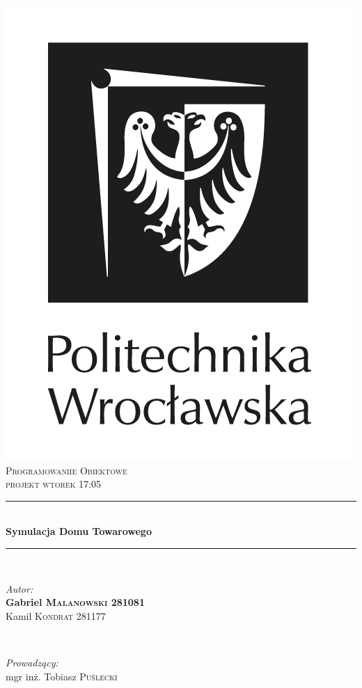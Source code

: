 \documentclass[11pt]{article}
\begin{document}
\begin{titlepage}
\newcommand{\HRule}{\rule{\linewidth}{0.5mm}} %
\center %
\includegraphics[scale = 0.21]{pwr-logo.png}\\[2cm]
\textsc{\Large Programowaniie Obiektowe}\\[0.5cm] 
\textsc{\large projekt wtorek 17:05}\\[0.5cm]
\HRule \\[0.4cm]
{ \huge \bfseries Symulacja Domu Towarowego
}\\[0.4cm] 
\HRule \\[0.8cm]
\begin{minipage}{0.5\textwidth}
\begin{flushleft} \large
\emph{Autor:}\\
\textbf{Gabriel \textsc{Malanowski} 281081} \\
Kamil \textsc{Kondrat} 281177 \\

\end{flushleft}
\end{minipage}
~
\begin{minipage}{0.4\textwidth}
\begin{flushright} \large
\emph{Prowadzący:} \\
mgr inż. Tobiasz \textsc{Puślecki} %
\end{flushright}
\end{minipage}\\[5cm]

\vfill %
\end{titlepage}
\end{document}
